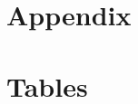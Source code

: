 \documentclass[a4paper,fleqn]{cas-dc}
\begin{document}
\clearpage

\appendix
\renewcommand{\thetable}{A.\arabic{table}}
\setcounter{table}{0}  %

\section*{Appendix}

\section{Tables}
\end{document}
